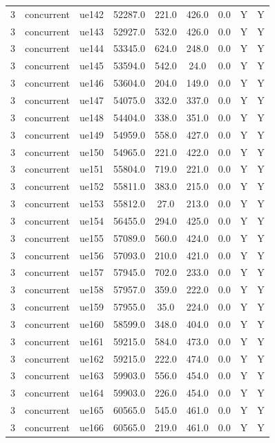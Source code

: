 \begin{table}[ht]
\begin{tabular}{|c|c|c|c|c|c|c|c|c|}
3 & concurrent & ue142 & 52287.0 & 221.0 & 426.0 & 0.0 & Y & Y \\
3 & concurrent & ue143 & 52927.0 & 532.0 & 426.0 & 0.0 & Y & Y \\
3 & concurrent & ue144 & 53345.0 & 624.0 & 248.0 & 0.0 & Y & Y \\
3 & concurrent & ue145 & 53594.0 & 542.0 & 24.0 & 0.0 & Y & Y \\
3 & concurrent & ue146 & 53604.0 & 204.0 & 149.0 & 0.0 & Y & Y \\
3 & concurrent & ue147 & 54075.0 & 332.0 & 337.0 & 0.0 & Y & Y \\
3 & concurrent & ue148 & 54404.0 & 338.0 & 351.0 & 0.0 & Y & Y \\
3 & concurrent & ue149 & 54959.0 & 558.0 & 427.0 & 0.0 & Y & Y \\
3 & concurrent & ue150 & 54965.0 & 221.0 & 422.0 & 0.0 & Y & Y \\
3 & concurrent & ue151 & 55804.0 & 719.0 & 221.0 & 0.0 & Y & Y \\
3 & concurrent & ue152 & 55811.0 & 383.0 & 215.0 & 0.0 & Y & Y \\
3 & concurrent & ue153 & 55812.0 & 27.0 & 213.0 & 0.0 & Y & Y \\
3 & concurrent & ue154 & 56455.0 & 294.0 & 425.0 & 0.0 & Y & Y \\
3 & concurrent & ue155 & 57089.0 & 560.0 & 424.0 & 0.0 & Y & Y \\
3 & concurrent & ue156 & 57093.0 & 210.0 & 421.0 & 0.0 & Y & Y \\
3 & concurrent & ue157 & 57945.0 & 702.0 & 233.0 & 0.0 & Y & Y \\
3 & concurrent & ue158 & 57957.0 & 359.0 & 222.0 & 0.0 & Y & Y \\
3 & concurrent & ue159 & 57955.0 & 35.0 & 224.0 & 0.0 & Y & Y \\
3 & concurrent & ue160 & 58599.0 & 348.0 & 404.0 & 0.0 & Y & Y \\
3 & concurrent & ue161 & 59215.0 & 584.0 & 473.0 & 0.0 & Y & Y \\
3 & concurrent & ue162 & 59215.0 & 222.0 & 474.0 & 0.0 & Y & Y \\
3 & concurrent & ue163 & 59903.0 & 556.0 & 454.0 & 0.0 & Y & Y \\
3 & concurrent & ue164 & 59903.0 & 226.0 & 454.0 & 0.0 & Y & Y \\
3 & concurrent & ue165 & 60565.0 & 545.0 & 461.0 & 0.0 & Y & Y \\
3 & concurrent & ue166 & 60565.0 & 219.0 & 461.0 & 0.0 & Y & Y \\

\end{tabular}
\end{table}
